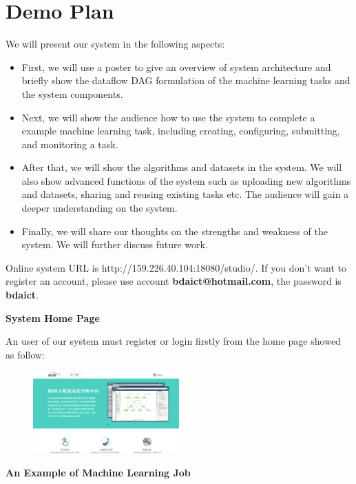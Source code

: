 \documentclass{sig-alternate-05-2015}
\begin{document}
\section{Demo Plan}
We will present our system in the following aspects:
\begin{itemize}
\item First, we will use a poster to give an overview of system architecture and briefly show the dataflow DAG formulation of the machine learning tasks and the system components.
\item Next, we will show the audience how to use the system to complete a example machine learning task, including creating, configuring, submitting, and monitoring a task.
\item After that, we will show the algorithms and datasets in the system. We will also show advanced functions of the system such as uploading new algorithms and datasets, sharing and reusing existing tasks etc. The audience will gain a deeper understanding on the system.
\item Finally, we will share our thoughts on the strengths and weakness of the system. We will further discuss future work.
\end{itemize}






\newpage
\appendix

Online system URL is http://159.226.40.104:18080/studio/. 
If you don't want to register an account, please use account \textbf{bdaict@hotmail.com}, the password is \textbf{bdaict}.

\noindent\textbf{System Home Page}

An user of our system must register or login firstly from the home page showed as follow:
\begin{figure}[!htb]
\centering
\includegraphics[width = 0.5\textwidth]{HomePage.eps}
\end{figure}

\noindent\textbf{An Example of Machine Learning Job}
\end{document}
